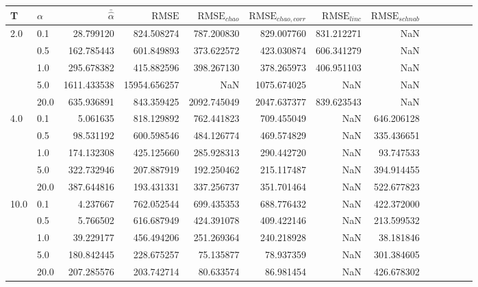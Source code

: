 \documentclass{article}
\begin{document}
\begin{table}[h]
\begin{tabular}{llrrrrrrrrrrr}
\toprule
  T   &  $\alpha$    &    $\bar{\hat{\alpha}}$ &          $\text{RMSE} $ &    $\text{RMSE}_{chao}$ &  $\text{RMSE}_{chao, corr}$ &  $\text{RMSE}_{linc}$ &  $\text{RMSE}_{schnab}$ \\
\midrule
2.0  & 0.1  &    28.799120 &    824.508274 &   787.200830 &       829.007760 &  831.212271 &          NaN \\
     & 0.5  &   162.785443 &    601.849893 &   373.622572 &       423.030874 &  606.341279 &          NaN \\
     & 1.0  &   295.678382 &    415.882596 &   398.267130 &       378.265973 &  406.951103 &          NaN \\
     & 5.0  &  1611.433538 &  15954.656257 &          NaN &      1075.674025 &         NaN &          NaN \\
     & 20.0 &   635.936891 &    843.359425 &  2092.745049 &      2047.637377 &  839.623543 &          NaN \\
4.0  & 0.1  &     5.061635 &    818.129892 &   762.441823 &       709.455049 &         NaN &   646.206128 \\
     & 0.5  &    98.531192 &    600.598546 &   484.126774 &       469.574829 &         NaN &   335.436651 \\
     & 1.0  &   174.132308 &    425.125660 &   285.928313 &       290.442720 &         NaN &    93.747533 \\
     & 5.0  &   322.732946 &    207.887919 &   192.250462 &       215.117487 &         NaN &   394.914455 \\
     & 20.0 &   387.644816 &    193.431331 &   337.256737 &       351.701464 &         NaN &   522.677823 \\
10.0 & 0.1  &     4.237667 &    762.052544 &   699.435353 &       688.776432 &         NaN &   422.372000 \\
     & 0.5  &     5.766502 &    616.687949 &   424.391078 &       409.422146 &         NaN &   213.599532\\
     & 1.0  &    39.229177 &    456.494206 &   251.269364 &       240.218928 &         NaN &    38.181846 \\
     & 5.0  &   180.842445 &    228.675257 &    75.135877 &        78.937359 &         NaN &   301.384605 \\
     & 20.0 &   207.285576 &    203.742714 &    80.633574 &        86.981454 &         NaN &   426.678302 \\
\bottomrule
\end{tabular}
\end{table}
\end{document}
